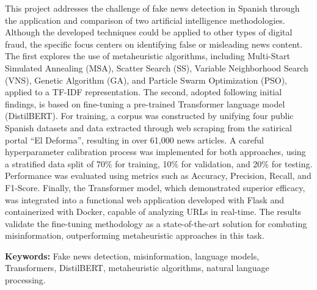 This project addresses the challenge of fake news detection in Spanish through the application and comparison of two artificial intelligence methodologies. Although the developed techniques could be applied to other types of digital fraud, the specific focus centers on identifying false or misleading news content. The first explores the use of metaheuristic algorithms, including Multi-Start Simulated Annealing (MSA), Scatter Search (SS), Variable Neighborhood Search (VNS), Genetic Algorithm (GA), and Particle Swarm Optimization (PSO), applied to a TF-IDF representation. The second, adopted following initial findings, is based on fine-tuning a pre-trained Transformer language model (DistilBERT). For training, a corpus was constructed by unifying four public Spanish datasets and data extracted through web scraping from the satirical portal ``El Deforma'', resulting in over 61,000 news articles. A careful hyperparameter calibration process was implemented for both approaches, using a stratified data split of 70\% for training, 10\% for validation, and 20\% for testing. Performance was evaluated using metrics such as Accuracy, Precision, Recall, and F1-Score. Finally, the Transformer model, which demonstrated superior efficacy, was integrated into a functional web application developed with Flask and containerized with Docker, capable of analyzing URLs in real-time. The results validate the fine-tuning methodology as a state-of-the-art solution for combating misinformation, outperforming metaheuristic approaches in this task.

\vspace{0.9cm}
\textbf{Keywords:} Fake news detection, misinformation, language models, Transformers, DistilBERT, metaheuristic algorithms, natural language processing.

\shipout\null
